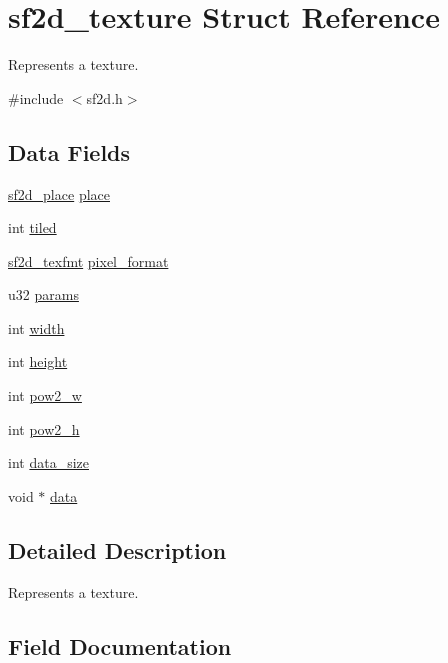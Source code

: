 \hypertarget{structsf2d__texture}{}\section{sf2d\+\_\+texture Struct Reference}
\label{structsf2d__texture}


Represents a texture.  




{\ttfamily \#include $<$sf2d.\+h$>$}

\subsection*{Data Fields}
\begin{DoxyCompactItemize}
\item 
\hyperlink{sf2d_8h_a07951fad547d423a4cf6521c2e5171ea}{sf2d\+\_\+place} \hyperlink{structsf2d__texture_ac30cfc2de337739d1a19858e4fdacaa4}{place}
\item 
int \hyperlink{structsf2d__texture_a4a66a4712612cc5e3f5cdff7d0e604ec}{tiled}
\item 
\hyperlink{sf2d_8h_a159c44ac8ef84cd08235063d4e220244}{sf2d\+\_\+texfmt} \hyperlink{structsf2d__texture_a1292c9a846b8593163bd3c1eaeb459c2}{pixel\+\_\+format}
\item 
u32 \hyperlink{structsf2d__texture_a1c257fef639d35305db19adfc9a0b6f2}{params}
\item 
int \hyperlink{structsf2d__texture_a312abd0ee8ab587825804132c136b253}{width}
\item 
int \hyperlink{structsf2d__texture_a055ccacd41038339dd1ded72747ccf8f}{height}
\item 
int \hyperlink{structsf2d__texture_aa1c5388828ad6d18ea37eb2e6ace7f48}{pow2\+\_\+w}
\item 
int \hyperlink{structsf2d__texture_a644c43b5fde6e12c8f1e3cb0280798e1}{pow2\+\_\+h}
\item 
int \hyperlink{structsf2d__texture_a99107fa90e683bab6456da738ff9d005}{data\+\_\+size}
\item 
void $\ast$ \hyperlink{structsf2d__texture_a46673c7ce439c63554a23e6ce83b254f}{data}
\end{DoxyCompactItemize}


\subsection{Detailed Description}
Represents a texture. 

\subsection{Field Documentation}
\hypertarget{structsf2d__texture_a46673c7ce439c63554a23e6ce83b254f}{}
